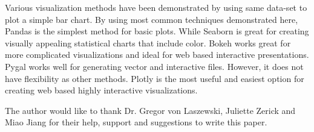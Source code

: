 \documentclass[sigconf]{acmart}
\begin{document}
Various visualization methods have been demonstrated by using same data-set to plot a simple bar chart. By using most common techniques demonstrated here, Pandas is the simplest method for basic plots. While Seaborn is great for creating visually appealing statistical charts that include color. Bokeh works great for more complicated visualizations and ideal for web based interactive presentations. Pygal works well for generating vector and interactive files. However, it does not have flexibility as other methods. Plotly is the most useful and easiest option for creating web based highly interactive visualizations. 


\begin{acks}

  The author would like to thank Dr. Gregor von Laszewski, Juliette Zerick and Miao Jiang for their help, support and suggestions to write this paper.

\end{acks}


 
\end{document}
